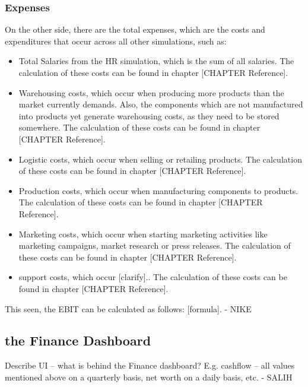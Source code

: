 \subsubsection{Expenses}
On the other side, there are the total expenses, which are the costs and expenditures that occur across all other simulations, such as:
\begin{itemize}
    \item Total Salaries from the HR simulation, which is the sum of all salaries. The calculation of these costs can be found in chapter [CHAPTER Reference].
    \item Warehousing costs, which occur when producing more products than the market currently demands. Also, the components which are not manufactured into products yet generate warehousing costs, as they need to be stored somewhere. The calculation of these costs can be found in chapter [CHAPTER Reference]. 
    \item Logistic costs, which occur when selling or retailing products. The calculation of these costs can be found in chapter [CHAPTER Reference].
    \item Production costs, which occur when manufacturing components to products. The calculation of these costs can be found in chapter [CHAPTER Reference].
    \item Marketing costs, which occur when starting marketing activities like marketing campaigns, market research or press releases. The calculation of these costs can be found in chapter [CHAPTER Reference].
    \item support costs, which occur [clarify].. The calculation of these costs can be found in chapter [CHAPTER Reference].
\end{itemize}

This seen, the EBIT can be calculated as follows: [formula]. - NIKE


\subsection{the Finance Dashboard}
Describe UI – what is behind the Finance dashboard? E.g. cashflow – all values mentioned above on a quarterly basis, net worth on a daily basis, etc. - SALIH

